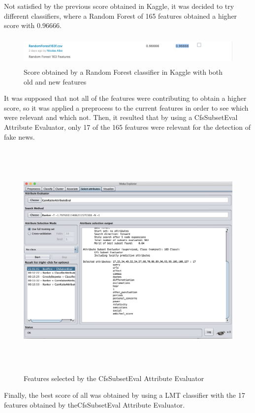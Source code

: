 \documentclass[runningheads]{llncs}
\begin{document}
Not satisfied by the previous score obtained in Kaggle, it was decided to try different classifiers, where a Random Forest of 165 features obtained a higher score with 0.96666.

\begin{figure}[hbt!]
\centering
\includegraphics[width=12cm, height=1.5cm]{RandomForest1.png}
\caption{Score obtained by a Random Forest classifier in Kaggle with both old and new features}
\end{figure}

It was supposed that not all of the features were contributing to obtain a higher score, so it was applied a preprocess to the current features in order to see which were relevant and which not. Then, it resulted that by using a CfsSubsetEval Attribute Evaluator, only 17 of the 165 features were relevant for the detection of fake news.

\begin{figure}[hbt!]
\centering
\includegraphics[width=15cm, height=12cm]{Cfs.png}
\caption{Features selected by the CfsSubsetEval Attribute Evaluator}
\end{figure}

Finally, the best score of all was obtained by using a LMT classifier with the 17 features obtained by theCfsSubsetEval Attribute Evaluator.
\end{document}
